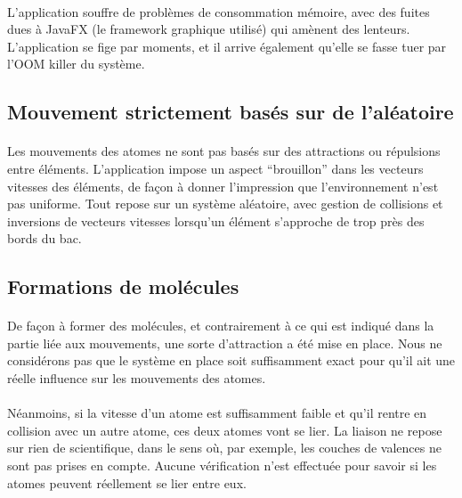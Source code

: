 \paragraph{}
L'application souffre de problèmes de consommation mémoire, avec des fuites
dues à JavaFX (le framework graphique utilisé) qui amènent des lenteurs.
L'application se fige par moments, et il arrive également qu'elle se fasse
tuer par l'OOM killer du système.


\subsection{Mouvement strictement basés sur de l'aléatoire}

\paragraph{}
Les mouvements des atomes ne sont pas basés sur des attractions ou répulsions
entre éléments. L'application impose un aspect ``brouillon'' dans les vecteurs
vitesses des éléments, de façon à donner l'impression que l'environnement n'est
pas uniforme. Tout repose sur un système aléatoire, avec gestion de collisions
et inversions de vecteurs vitesses lorsqu'un élément s'approche de trop près
des bords du bac.


\subsection{Formations de molécules}

\paragraph{}
De façon à former des molécules, et contrairement à ce qui est indiqué dans la
partie liée aux mouvements, une sorte d'attraction a été mise en place. Nous ne
considérons pas que le système en place soit suffisamment exact pour qu'il ait
une réelle influence sur les mouvements des atomes.

\paragraph{}
Néanmoins, si la vitesse d'un atome est suffisamment faible et qu'il rentre en
collision avec un autre atome, ces deux atomes vont se lier. La liaison ne
repose sur rien de scientifique, dans le sens où, par exemple, les couches de
valences ne sont pas prises en compte. Aucune vérification n'est effectuée
pour savoir si les atomes peuvent réellement se lier entre eux.
